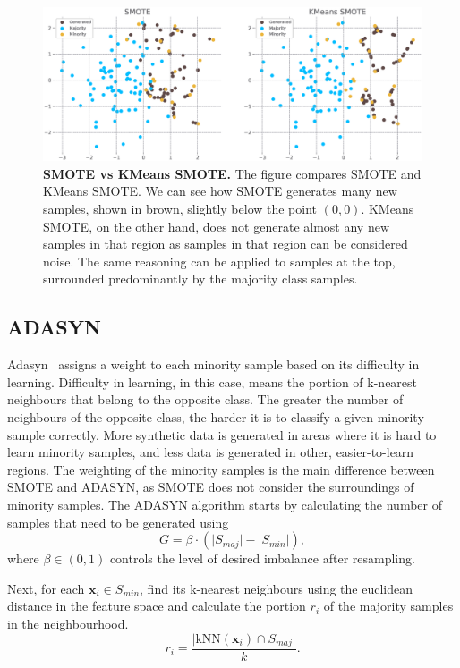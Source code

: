 \begin{figure}
    \centering
    \includegraphics[width=\linewidth]{figures/smote_vs_kmeanssmote.eps}
    \caption{
        \textbf{SMOTE vs KMeans SMOTE.} The figure compares SMOTE and KMeans SMOTE. We can see how
        SMOTE generates many new samples, shown in brown, slightly below the point $(0, 0)$. KMeans
        SMOTE, on the other hand, does not generate almost any new samples in that region as
        samples in that region can be considered noise. The same reasoning can be applied to
        samples at the top, surrounded predominantly by the majority class samples.
    }
    \label{figure:smote-vs-kmeanssmote}
\end{figure}


\subsection{ADASYN}
\label{subsection:adasyn}

Adasyn~\cite{adasyn} assigns a weight to each minority sample based on its difficulty in learning.
Difficulty in learning, in this case, means the portion of k-nearest neighbours that belong to the
opposite class. The greater the number of neighbours of the opposite class, the harder it is to
classify a given minority sample correctly. More synthetic data is generated in areas where it is
hard to learn minority samples, and less data is generated in other, easier-to-learn regions. The
weighting of the minority samples is the main difference between SMOTE and ADASYN, as SMOTE does
not consider the surroundings of minority samples. The ADASYN algorithm starts by calculating the
number of samples that need to be generated using
\begin{equation}
    G = \beta \cdot (\lvert S_{maj} \rvert - \lvert S_{min} \rvert),
\end{equation}
where $\beta \in (0, 1)$ controls the level of desired imbalance after resampling.

Next, for each $\mathbf{x}_i \in S_{min}$, find its k-nearest neighbours using the euclidean
distance in the feature space and calculate the portion $r_i$ of the majority samples in the
neighbourhood.
\begin{equation}
    r_i = \frac{\lvert \mathrm{kNN}(\mathbf{x}_i) \cap S_{maj} \rvert}{k}.
\end{equation}


